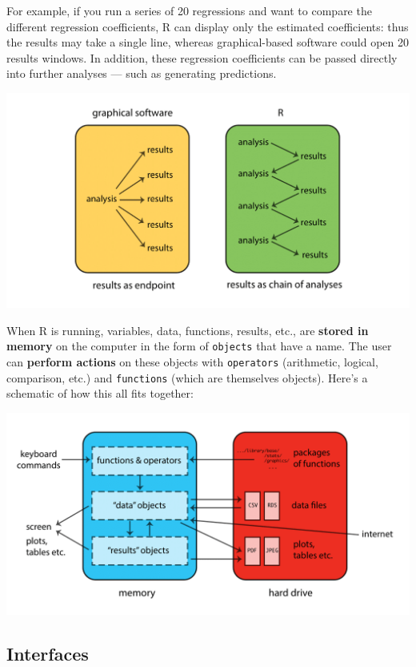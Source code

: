 \documentclass[
]{book}
\begin{document}
For example, if you run a series of 20 regressions and want to compare the different regression coefficients, R can display only the estimated coefficients: thus the results may take a single line, whereas graphical-based software could open 20 results windows. In addition, these regression coefficients can be passed directly into further analyses --- such as generating predictions.

\includegraphics{R/Rintro/images/R_chain.png}

When R is running, variables, data, functions, results, etc., are \textbf{stored in memory} on the computer in the form of \texttt{objects} that have a name. The user can \textbf{perform actions} on these objects with \texttt{operators} (arithmetic, logical, comparison, etc.) and \texttt{functions} (which are themselves objects). Here's a schematic of how this all fits together:

\includegraphics{R/Rintro/images/R_works.png}

\hypertarget{interfaces}{%
\subsection{Interfaces}\label{interfaces}}
\end{document}
